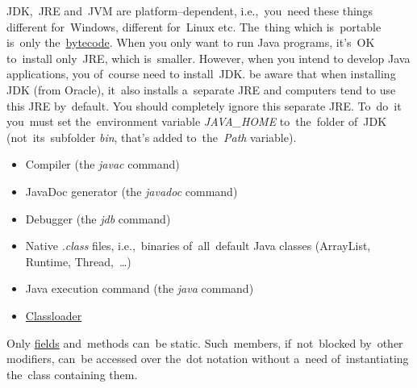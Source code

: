 \noindent JDK,~JRE and~JVM are platform--dependent, i.e.,~you~need these things different for~Windows, different for~Linux etc.
The~thing which is~portable is~only the~\hyperref[bytecode]{bytecode}.
When you only want to run Java programs, it's~OK to~install only~JRE, which is~smaller.
However, when you intend to develop Java applications, you of~course need to install~JDK.
be aware that when installing JDK (from Oracle), it~also installs a~separate JRE and computers tend to use this JRE by~default.
You should completely ignore this separate JRE.
To~do~it you~must set the~environment variable \textit{JAVA\_HOME} to~the~folder of~JDK (not~its~subfolder \textit{bin}, that's added to~the~\textit{Path} variable).

\begin{itemize}
    \item Compiler (the \textit{javac} command)
    \item JavaDoc generator (the \textit{javadoc} command)
    \item Debugger (the \textit{jdb} command)
\end{itemize}

\begin{itemize}
    \item Native \textit{.class} files, i.e.,~binaries of~all~default Java classes (ArrayList, Runtime, Thread,~\dots)
    \item Java execution command (the \textit{java} command)
    \item \hyperref[classloaders]{Classloader}
\end{itemize}

\label{javadatatypes}

\label{javaaccessmodifiers}

\label{javapublic}

\label{javaprotected}

\label{javaprivate}

\label{javastatic}
Only \hyperref[variablefieldproperty]{fields} and~methods can~be static.
Such~members, if~not~blocked by~other modifiers, can~be accessed over the~dot notation without a~need of~instantiating the~class containing them.

